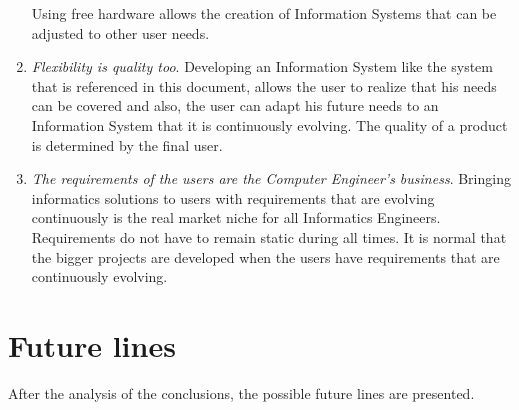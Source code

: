\begin{enumerate}
Using free hardware allows the creation of Information Systems that can be adjusted to other user needs.

\item \textit{Flexibility is quality too}. Developing an Information System like the system that is referenced in this document, allows the user to realize that his needs can be covered and also, the user can adapt his future needs to an Information System that it is continuously evolving. The quality of a product is determined by the final user.

\item \textit{The requirements of the users are the Computer Engineer's business}. Bringing informatics solutions to users with requirements that are evolving continuously is the real market niche for all Informatics Engineers. Requirements do not have to remain static during all times. It is normal that the bigger projects are developed when the users have requirements that are continuously evolving.

\end{enumerate}




\section{Future lines}

After the analysis of the conclusions, the possible future lines are presented. 

